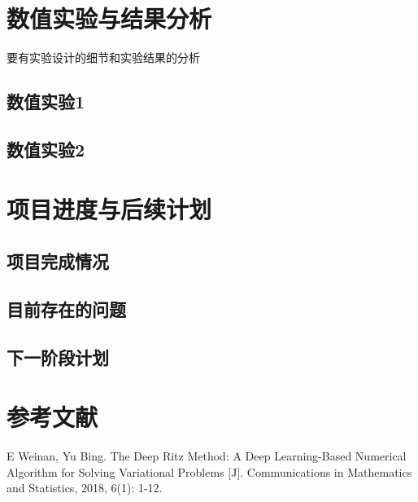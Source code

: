 \documentclass[UTF8,a4paper,zihao=-4]{ctexart}
\numberwithin{equation}{section}
\numberwithin{figure}{section}
\numberwithin{table}{section}
\begin{document}
\newpage
\section{数值实验与结果分析}
要有实验设计的细节和实验结果的分析


\subsection{数值实验1}
\songti{}



\newpage

\subsection{数值实验2}
\songti{}


\newpage
\section{项目进度与后续计划}

\subsection{项目完成情况}
\songti{}



\subsection{目前存在的问题}
\songti{}



\subsection{下一阶段计划}
\songti{}

\newpage
\section*{\heiti{} 参考文献}

\songti{}
\begin{enumerate}[
    label={[\arabic*]}, 
    leftmargin=3.5em, 
    itemsep=4pt, 
    align=left
]
    \item \label{cite:DeepRitz} E Weinan, Yu Bing. The Deep Ritz Method: A Deep Learning-Based Numerical Algorithm for Solving Variational Problems [J]. Communications in Mathematics and Statistics, 2018, 6(1): 1-12.
\end{enumerate}
\end{document}
